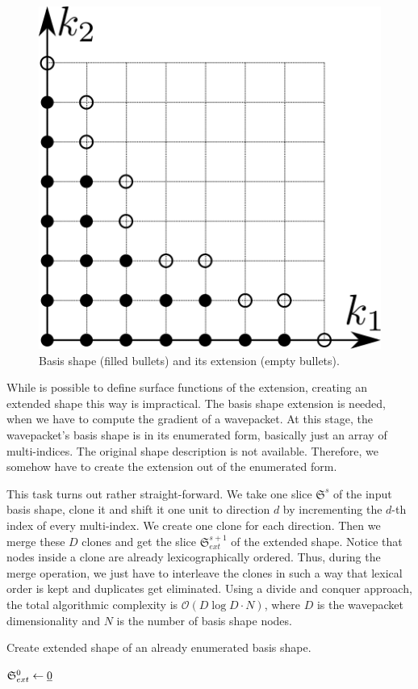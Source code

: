 \documentclass{article}
\begin{document}
\begin{figure}[H]
  \begin{center}
    \includegraphics[width=0.5\linewidth]{shape_extension}
  \end{center}
  \caption{Basis shape (filled bullets) and its extension (empty
    bullets).}
\end{figure}

While is possible to define surface functions of the extension,
creating an extended shape this way is impractical.
The basis shape extension is needed, when
we have to compute the gradient of a wavepacket. At this stage,
the wavepacket's basis shape is in its enumerated form,
basically just an array of multi-indices. The original shape description is not available.
Therefore, we somehow have to create the extension out of the enumerated form.
\par
This task turns out rather straight-forward. We take one slice \(\mathfrak{S}^s\) of
the input basis shape, clone it and
shift it one unit to direction \(d\) by incrementing the \(d\)-th index of every multi-index.
We create one clone for each direction. Then we merge these \(D\) clones and get the
slice \(\mathfrak{S}_{ext}^{s+1}\) of the extended shape.
Notice that nodes inside a clone are already lexicographically ordered.
Thus, during the merge operation, we just have to interleave the clones in such a way that
lexical order is kept and duplicates get eliminated.
Using a divide and conquer approach, the total algorithmic complexity is
\(\mathcal{O}(D\log{}D \cdot N)\), where \(D\) is the wavepacket dimensionality and \(N\)
is the number of basis shape nodes.

\begin{algorithm}[H]
  \caption{Create extended shape of an already enumerated basis shape.}
  \(\mathfrak{S}_{ext}^0 \leftarrow \underline{0}\)\;
\end{algorithm}
\end{document}
